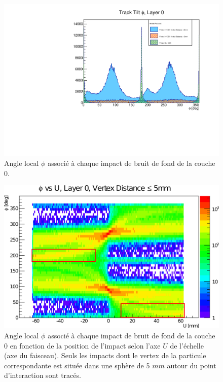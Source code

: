   \begin{figure}[!htb]
    \centering
    \includegraphics[scale=0.60]{./figures/Track_Tilts_Beamstrahlung/beamstrahlung_Phi/Track_Tilts_Phi_Layer0.pdf}
    \caption{Angle local $\phi$ associ\'e \`a chaque impact de bruit de fond de la couche 0.}
    \label{fig:phi_Layer0}
  \end{figure}
  
  \begin{figure}[!htb]
    \centering
    \includegraphics[scale=0.60]{./figures/Track_Tilts_Beamstrahlung/beamstrahlung_Phi/Phi_vs_U_Layer0_VertexDistance_inf_5mm_zones.pdf}
    \caption{Angle local $\phi$ associ\'e \`a chaque impact de bruit de fond de la couche 0 en fonction de la position de l'impact selon l'axe $U$ de l'\'echelle (axe du faisceau). Seuls les impacts dont le vertex de la particule correspondante est situ\'ee dans une sph\`ere de 5 $mm$ autour du point d'interaction sont trac\'es.}
    \label{fig:phi_vs_U_Layer0}
  \end{figure}
  
